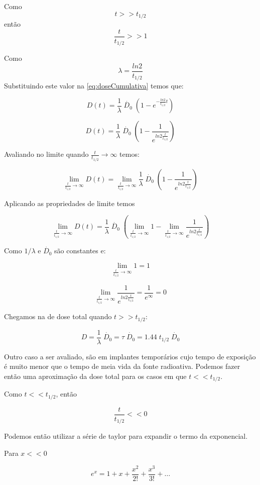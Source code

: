 \documentclass[11pt,a4paper]{article}
\begin{document}
			Como $$t >> t_{1/2}$$ então $$\frac{t}{t_{1/2}} >> 1$$

			Como $$\lambda = \frac{ln 2}{t_{1/2}}$$ Substituindo este valor na   \ref{eq:doseCumulativa} temos que: 

			$$ D(t) = \frac{1}{\lambda}  \; \dot{D_0} \; \left(1 - e^{-\frac{ln 2}{t_{1/2}} t}\right) $$

			$$D(t) = \frac{1}{\lambda}  \; \dot{D_0} \; \left(1 - \frac{1}{e^{ln 2 \frac{t}{t_{1/2}}}}\right)$$

			Avaliando no limite quando $\frac{t}{t_{1/2}} \rightarrow \infty$ temos:

			$$ \lim_{{\frac{t}{t_{1/2}}} \to \infty} D(t) = \lim_{{\frac{t}{t_{1/2}}} \to \infty} \frac{1}{\lambda}  \; \dot{D_0} \; \left(1 - \frac{1}{e^{ln 2 \frac{t}{t_{1/2}}}}\right)$$

			Aplicando as propriedades de limite temos

			$$\lim_{{\frac{t}{t_{1/2}}} \to \infty} D(t) = \frac{1}{\lambda} \; \dot{D_0} \;  \left(\lim_{{\frac{t}{t_{1/2}}} \to \infty} 1 - \lim_{{\frac{t}{t_{1/2}}} \to \infty} \frac{1}{e^{ln 2 \frac{t}{t_{1/2}}}}\right)$$

			Como $1/ \lambda$ e $\dot{D_0}$ são constantes e:

			$$\lim_{{\frac{t}{t_{1/2}}} \to \infty} 1 = 1$$

			$$\lim_{{\frac{t}{t_{1/2}}} \to \infty} \frac{1}{e^{ln 2 \frac{t}{t_{1/2}}}} = \frac{1}{e^{\infty}} = 0 $$

			Chegamos na   de dose total quando $t >> t_{1/2}$:

			\begin{equation}
				D = \frac{1}{\lambda} \; \dot{D_0} = \tau \; \dot{D_0} = 1.44 \; t_{1/2} \; \dot{D_0}
				\label{eq:aproximacaoImplantesPermanentes}
			\end{equation}


			Outro caso a ser avaliado, são em implantes temporários cujo tempo de exposição é muito menor que o tempo de meia vida da fonte radioativa. Podemos fazer então uma aproximação da dose total para os casos em que $t << t_{1/2}$. 


			Como $t << t_{1/2}$, então

			$$\frac{t}{t_{1/2}} << 0 $$

			Podemos então utilizar a série de taylor para expandir o termo da exponencial. 

			Para $x << 0$

			$$e^x = 1 + x + \frac{x^2}{2!} + \frac{x^3}{3!} + \dots$$
\end{document}
